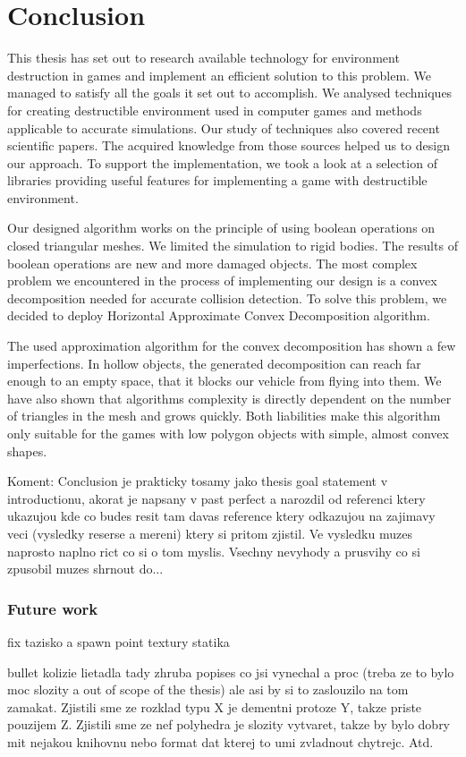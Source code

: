 \chapter*{Conclusion}

This thesis has set out to research available technology for environment destruction in games and implement an efficient solution to this problem. We managed to satisfy all the goals it set out to accomplish. We analysed techniques for creating destructible environment used in computer games and methods applicable to accurate simulations. Our study of techniques also covered recent scientific papers. The acquired knowledge from those sources helped us to design our approach. To support the implementation, we took a look at a selection of libraries providing useful features for implementing a game with destructible environment.

Our designed algorithm works on the principle of using boolean operations on closed triangular meshes. We limited the simulation to rigid bodies. The results of boolean operations are new and more damaged objects. The most complex problem we encountered in the process of implementing our design is a convex decomposition needed for accurate collision detection. To solve this problem, we decided to deploy Horizontal Approximate Convex Decomposition algorithm.

The used approximation algorithm for the convex decomposition has shown a few imperfections. In hollow objects, the generated decomposition can reach far enough to an empty space, that it blocks our vehicle from flying into them. We have also shown that algorithms complexity is directly dependent on the number of triangles in the mesh and grows quickly. Both liabilities make this algorithm only suitable for the games with low polygon objects with simple, almost convex shapes.



Koment: Conclusion je prakticky tosamy jako thesis goal statement v introductionu, akorat je napsany v past perfect a narozdil od referenci ktery ukazujou kde co budes resit tam davas reference ktery odkazujou na zajimavy veci (vysledky reserse a mereni) ktery si pritom zjistil. Ve vysledku muzes naprosto naplno rict co si o tom myslis. Vsechny nevyhody a prusvihy co si zpusobil muzes shrnout do...

\subsection*{Future work}
fix tazisko a spawn point
textury
statika

bullet kolizie lietadla
tady zhruba popises co jsi vynechal a proc (treba ze to bylo moc slozity a out of scope of the thesis) ale asi by si to zaslouzilo na tom zamakat. Zjistili sme ze rozklad typu X je dementni protoze Y, takze priste pouzijem Z. Zjistili sme ze nef polyhedra je slozity vytvaret, takze by bylo dobry mit nejakou knihovnu nebo format dat kterej to umi zvladnout chytrejc. Atd.
